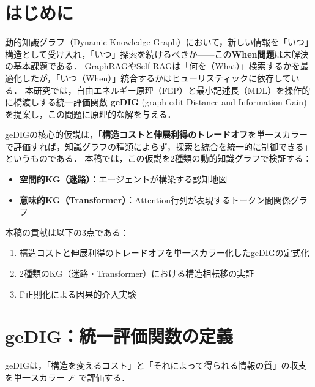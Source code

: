 \section{はじめに}

動的知識グラフ（Dynamic Knowledge Graph）において，新しい情報を「いつ」構造として受け入れ，「いつ」探索を続けるべきか——この\textbf{When問題}は未解決の基本課題である．
GraphRAG\cite{edge2024}やSelf-RAG\cite{asai2023}は「何を（What）」検索するかを最適化したが，「いつ（When）」統合するかはヒューリスティックに依存している．
本研究では，自由エネルギー原理（FEP）\cite{friston2010}と最小記述長（MDL）\cite{grunwald2007}を操作的に橋渡しする統一評価関数 \textbf{geDIG} (graph edit Distance and Information Gain) を提案し，この問題に原理的な解を与える．

geDIGの核心的仮説は，「\textbf{構造コストと伸展利得のトレードオフ}を単一スカラーで評価すれば，知識グラフの種類によらず，探索と統合を統一的に制御できる」というものである．
本稿では，この仮説を2種類の動的知識グラフで検証する：
\begin{itemize}
    \item \textbf{空間的KG（迷路）}：エージェントが構築する認知地図
    \item \textbf{意味的KG（Transformer）}：Attention行列が表現するトークン間関係グラフ
\end{itemize}
本稿の貢献は以下の3点である：
\begin{enumerate}
    \item 構造コストと伸展利得のトレードオフを単一スカラー化したgeDIGの定式化
    \item 2種類のKG（迷路・Transformer）における構造相転移の実証
    \item F正則化による因果的介入実験
\end{enumerate}


\section{geDIG：統一評価関数の定義}

geDIGは，「構造を変えるコスト」と「それによって得られる情報の質」の収支を単一スカラー $\mathcal{F}$ で評価する．

